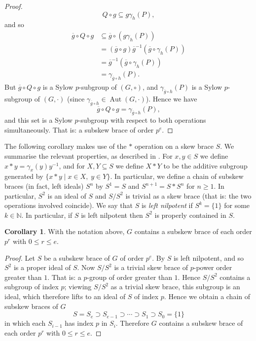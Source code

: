 \documentclass[12pt,a4paper, reqno]{amsart}
\theoremstyle{definition}
\newtheorem{corollary}[theorem]{Corollary}
\renewcommand{\bar}{\overline}
\DeclareMathOperator{\Aut}{\mbox{Aut}}
\begin{document}
\begin{proof}
\[ Q \circ g \subseteq g \gamma_{h}(P), \]
and so 
\begin{align*}
\bar{g} \circ Q \circ g & \subseteq \bar{g} \circ (g\gamma_{h}(P)) \\
& = (\bar{g} \circ g) \bar{g}^{-1} (\bar{g} \circ \gamma_{h}(P)) \\
& = \bar{g}^{-1} (\bar{g} \circ \gamma_{h}(P)) \\
& = \gamma_{\bar{g}\circ h}(P).
\end{align*}
But $ \bar{g} \circ Q \circ g $ is a Sylow $ p $-subgroup of $ (G,\circ) $, and $ \gamma_{\bar{g} \circ h}(P) $ is a Sylow $ p $-subgroup of $ (G,\cdot) $ (since $ \gamma_{\bar{g} \circ h} \in \Aut(G,\cdot) $). Hence we have
\[ \bar{g} \circ Q \circ g  = \gamma_{\bar{g} \circ h}(P), \]
and this set is a Sylow $ p $-subgroup with respect to both operations simultaneously. That is: a subskew brace of order $ p^{e} $. 
\end{proof}

The following corollary makes use of the $ \ast $ operation on a skew brace $ S $. We summarise the relevant properties, as described in \cite[Section 2]{CSV19}. For $ x,y \in S $ we define $ x \ast y = \gamma_{x}(y)y^{-1} $, and for $ X,Y \subseteq S $ we define $ X \ast Y $ to be the additive subgroup generated by $ \{ x \ast y \mid x \in X, \; y \in Y \} $. In particular, we define a chain of subskew braces (in fact, left ideals) $ S^{n} $ by $ S^{1}=S $ and $ S^{n+1} = S \ast S^{n} $ for $ n \geq 1 $. In particular, $ S^{2} $ is an ideal of $ S $ and $ S / S^{2} $ is trivial as a skew brace (that is: the two operations involved coincide). We say that $ S $ is \textit{left nilpotent} if $ S^{k} = \{ 1 \} $ for some $ k \in \mathbb{N} $. In particular, if $ S $ is left nilpotent then $ S^{2} $ is properly contained in $ S $. 

\begin{corollary} \label{cor_p_r}
With the notation above, $ G $ contains a subskew brace of each order $ p^{r} $ with $ 0 \leq r \leq e $. 
\end{corollary}
\begin{proof}
Let $ S $ be a subskew brace of $ G $ of order $ p^{e} $. By \cite[Proposition 4.4]{CSV19} $ S $ is left nilpotent, and so $ S^{2} $ is a proper ideal of $ S $. Now $ S / S^{2} $ is a trivial skew brace of $ p $-power order greater than $ 1 $. That is: a $ p $-group of order greater than $ 1 $. Hence $ S / S^{2} $ contains a subgroup of index $ p $; viewing $ S / S^{2} $ as a trivial skew brace, this subgroup is an ideal, which therefore lifts to an ideal of $ S $ of index $ p $. Hence we obtain a chain of subskew braces of $ G $
\[ S = S_{e} \supset S_{e-1} \supset \cdots \supset S_{1} \supset S_{0} = \{ 1 \} \]
in which each $ S_{i-1} $ has index $ p $ in $ S_{i} $. Therefore $ G $ contains a subskew brace of each order $ p^{r} $ with $ 0 \leq r \leq e $. 
\end{proof}
\end{document}
